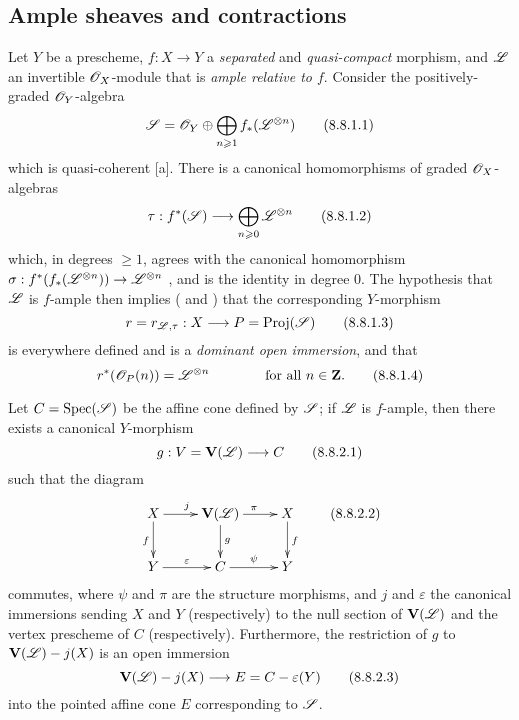 \subsection{Ample sheaves and contractions}
\label{subsection:II.8.8}

\begin{env}[8.8.1]
\label{II.8.8.1}
Let $Y$ be a prescheme, $f:X\to Y$ a \emph{separated} and \emph{quasi-compact} morphism, and $\mathscr{L}$ an invertible $\mathscr{O}_X$-module that is \emph{ample relative to $f$}.
Consider the positively-graded $\mathscr{O}_Y$-algebra
\[
\label{II.8.8.1.1}
  \mathscr{S} = \mathscr{O}_Y \oplus \bigoplus_{n\geqslant1}f_*(\mathscr{L}^{\otimes n})
\tag{8.8.1.1}
\]
which is quasi-coherent [a].
There is a canonical homomorphisms of graded $\mathscr{O}_X$-algebras
\[
\label{II.8.8.1.2}
  \tau: f^*(\sh{S}) \to \bigoplus_{n\geq0}\sh{L}^{\otimes n}
\tag{8.8.1.2}
\]
which, in degrees $\geq1$, agrees with the canonical homomorphism $\sigma:f^*(f_*(\sh{L}^{\otimes n})) \to \sh{L}^{\otimes n}$ , and is the identity in degree 0.
The hypothesis that $\mathscr{L}$ is $f$-ample then implies ( and ) that the corresponding $Y$-morphism
\[
\label{II.8.8.1.3}
  r = r_{\sh{L},\tau} : X \to P = \Proj(\sh{S})
\tag{8.8.1.3}
\]
is everywhere defined and is a \emph{dominant open immersion}, and that
\[
\label{II.8.8.1.4}
  r^*(\mathscr{O}_P(n)) = \mathscr{L}^{\otimes n}
  \qquad\qquad
  \mbox{for all $n\in\mathbf{Z}$.}
\tag{8.8.1.4}
\]
\end{env}

\begin{proposition}[8.8.2]
\label{II.8.8.2}
Let $C=\operatorname{Spec}(\mathscr{S})$ be the affine cone defined by $\mathscr{S}$;
if $\mathscr{L}$ is $f$-ample, then there exists a canonical $Y$-morphism
\[
\label{II.8.8.2.1}
  g : V = \bb{V}(\sh{L}) \to C
\tag{8.8.2.1}
\]
such that the diagram
\[
\label{II.8.8.2.2}
  \xymatrix{
    X
      \ar[r]^{j}
      \ar[d]_{f}
  & \bb{V}(\sh{L})
      \ar[r]^{\pi}
      \ar[d]^{g}
  & X
      \ar[d]^{f}
  \\Y
      \ar[r]^{\varepsilon}
  & C
      \ar[r]^{\psi}
  & Y
  }
  \tag{8.8.2.2}
\]
commutes, where $\psi$ and $\pi$ are the structure morphisms, and $j$ and $\varepsilon$ the canonical immersions sending $X$ and $Y$ (respectively) to the null section of $\mathbf{V}(\mathscr{L})$ and the vertex prescheme of $C$ (respectively).
Furthermore, the restriction of $g$ to $\mathbf{V}(\mathscr{L})- j(X)$ is an open immersion
\[
\label{II.8.8.2.3}
  \bb{V}(\sh{L})\setmin j(X)\to E=C\setmin\varepsilon(Y)
  \tag{8.8.2.3}
\]
into the pointed affine cone $E$ corresponding to $\mathscr{S}$.
\end{proposition}

